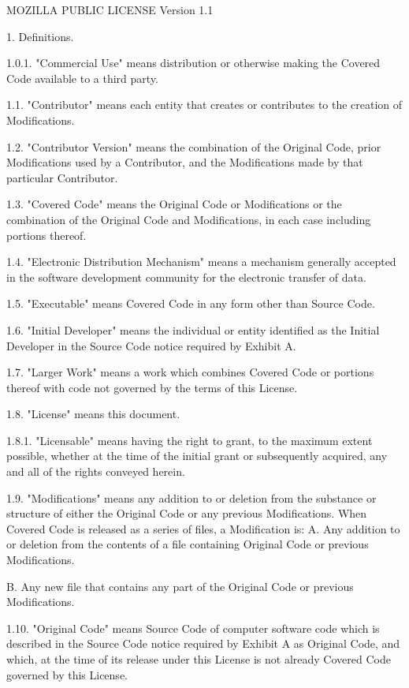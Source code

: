 \begin{DoxyCode}
MOZILLA PUBLIC LICENSE
Version 1.1

1. Definitions.

     1.0.1. "Commercial Use" means distribution or otherwise making the
     Covered Code available to a third party.

     1.1. "Contributor" means each entity that creates or contributes to
     the creation of Modifications.

     1.2. "Contributor Version" means the combination of the Original
     Code, prior Modifications used by a Contributor, and the Modifications
     made by that particular Contributor.

     1.3. "Covered Code" means the Original Code or Modifications or the
     combination of the Original Code and Modifications, in each case
     including portions thereof.

     1.4. "Electronic Distribution Mechanism" means a mechanism generally
     accepted in the software development community for the electronic
     transfer of data.

     1.5. "Executable" means Covered Code in any form other than Source
     Code.

     1.6. "Initial Developer" means the individual or entity identified
     as the Initial Developer in the Source Code notice required by Exhibit
     A.

     1.7. "Larger Work" means a work which combines Covered Code or
     portions thereof with code not governed by the terms of this License.

     1.8. "License" means this document.

     1.8.1. "Licensable" means having the right to grant, to the maximum
     extent possible, whether at the time of the initial grant or
     subsequently acquired, any and all of the rights conveyed herein.

     1.9. "Modifications" means any addition to or deletion from the
     substance or structure of either the Original Code or any previous
     Modifications. When Covered Code is released as a series of files, a
     Modification is:
          A. Any addition to or deletion from the contents of a file
          containing Original Code or previous Modifications.

          B. Any new file that contains any part of the Original Code or
          previous Modifications.

     1.10. "Original Code" means Source Code of computer software code
     which is described in the Source Code notice required by Exhibit A as
     Original Code, and which, at the time of its release under this
     License is not already Covered Code governed by this License.


\end{DoxyCode}
